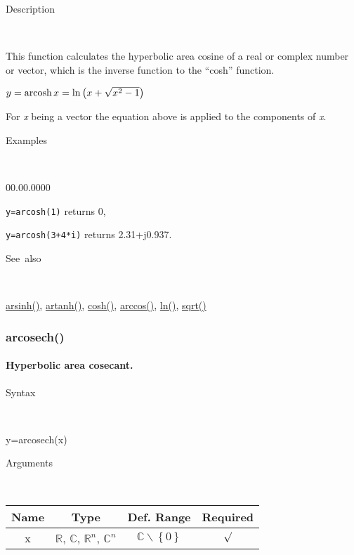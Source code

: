 \begin{description}
\item [Description]~
\end{description}
This function calculates the hyperbolic area cosine of a real or complex
number or vector, which is the inverse function to the {}``cosh''
function.

\medskip{}
$y=\textrm{arcosh\,}x=\ln\left(x+\sqrt{x^{2}-1}\right)$ 
\medskip{}

For \textit{x} being a vector the equation above is applied
to the components of \textit{x}.

\begin{description}
\item [Examples]~
\end{description}
\begin{lyxlist}{00.00.0000}
\item [\texttt{y=arcosh(1)}]returns 0,
\item [\texttt{y=arcosh(3+4{*}i)}]returns 2.31+j0.937.
\end{lyxlist}
\begin{description}
\item [See~also]~
\end{description}
\textcolor{blue}{\hyperlink{arsinh}{arsinh()}}\textcolor{black}{,}
\textcolor{blue}{\hyperlink{artanh}{artanh()}}\textcolor{black}{,}
\textcolor{blue}{\hyperlink{cosh}{cosh()}}\textcolor{black}{,} \textcolor{blue}{\hyperlink{arccos}{arccos()}}\textcolor{black}{,}
\textcolor{blue}{\hyperlink{ln}{ln()}}\textcolor{black}{,} \textcolor{blue}{\hyperlink{sqrt}{sqrt()}}


\newpage
\subsubsection*{\hypertarget{arcosech}{}{\Large arcosech()}}


\paragraph{\label{par:Hyperbolic-area-cosec}Hyperbolic area cosecant.}

\begin{description}
\item [Syntax]~
\end{description}
y=arcosech(x)

\begin{description}
\item [Arguments]~
\end{description}
\begin{tabular}{|c|c|c|c|}
\hline 
Name&
Type&
Def. Range&
Required\tabularnewline
\hline
\hline 
x&
$\mathbb{R}$, $\mathbb{C}$, $\mathbb{R}^{n}$, $\mathbb{C}^{n}$&
$\mathbb{C}\backslash \left\lbrace 0\right\rbrace $&
$\surd$\tabularnewline
\hline
\end{tabular}

